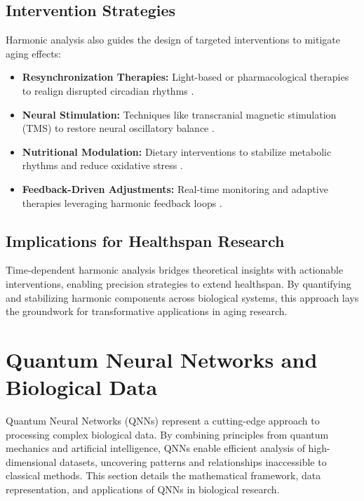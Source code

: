 \documentclass{article}
\theoremstyle{plain}
\begin{document}
\subsection{Intervention Strategies}
Harmonic analysis also guides the design of targeted interventions to mitigate aging effects:
\begin{itemize}
    \item \textbf{Resynchronization Therapies:} Light-based or pharmacological therapies to realign disrupted circadian rhythms \cite{circadianTherapies2023}.
    \item \textbf{Neural Stimulation:} Techniques like transcranial magnetic stimulation (TMS) to restore neural oscillatory balance \cite{neuralIntervention2023}.
    \item \textbf{Nutritional Modulation:} Dietary interventions to stabilize metabolic rhythms and reduce oxidative stress \cite{dietaryRhythms2023}.
    \item \textbf{Feedback-Driven Adjustments:} Real-time monitoring and adaptive therapies leveraging harmonic feedback loops \cite{feedbackTherapies2023}.
\end{itemize}

\subsection{Implications for Healthspan Research}
Time-dependent harmonic analysis bridges theoretical insights with actionable interventions, enabling precision strategies to extend healthspan. By quantifying and stabilizing harmonic components across biological systems, this approach lays the groundwork for transformative applications in aging research.



\section{Quantum Neural Networks and Biological Data}
\label{sec:qnn_bio_data}

Quantum Neural Networks (QNNs) represent a cutting-edge approach to processing complex biological data. By combining principles from quantum mechanics and artificial intelligence, QNNs enable efficient analysis of high-dimensional datasets, uncovering patterns and relationships inaccessible to classical methods. This section details the mathematical framework, data representation, and applications of QNNs in biological research.
\end{document}
